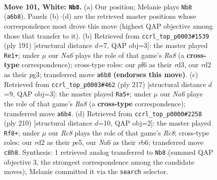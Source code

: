 \documentclass[11pt]{article}
\begin{document}
\clearpage

\begin{figure}[p]\centering
\begin{subfigure}{0.46\textwidth}\centering
\resizebox{\linewidth}{!}{%
\newchessgame
\chessboard[
  setfen={2R5/6p1/N4p1k/7p/7P/6PK/3r4/8 w - - 26 101},
  showmover=false,
  pgfstyle=straightmove, color=movearrow, markmove={a6-b8}
]}
\caption{}
\end{subfigure}\hfill
\begin{subfigure}{0.46\textwidth}\centering
\resizebox{\linewidth}{!}{%
\newchessgame
\chessboard[
  setfen={8/8/6pk/7p/4K2P/3R1PP1/8/r7 b - - 59 96},
  showmover=false,
  pgfstyle=straightmove, color=movearrow, markmove={a1-e1}
]}
\caption{}
\end{subfigure}
\\[4pt]
\begin{subfigure}{0.46\textwidth}\centering
\resizebox{\linewidth}{!}{%
\newchessgame
\chessboard[
  setfen={8/5pk1/7p/5K1P/5PP1/1R6/8/r7 b - - 24 109},
  showmover=false,
  pgfstyle=straightmove, color=movearrow, markmove={a1-a5}
]}
\caption{}
\end{subfigure}\hfill
\begin{subfigure}{0.46\textwidth}\centering
\resizebox{\linewidth}{!}{%
\newchessgame
\chessboard[
  setfen={2R5/8/1r3k2/4p1p1/5pP1/5P2/4PK2/8 w - - 14 106},
  showmover=false,
  pgfstyle=straightmove, color=movearrow, markmove={c8-f8}
]}
\caption{}
\end{subfigure}
\caption{\textbf{Move 101, White: \texttt{Nb8}.} (a) Our position; Melanie plays \texttt{Nb8} (\texttt{a6b8}). Panels (b)--(d) are the retrieved master positions whose correspondence most drove this move (highest QAP objective among those that transfer to it). (b) Retrieved from \texttt{ccrl\_top\_p0003\#1539} (ply 191) [structural distance $d$=7, QAP obj=3]: the master played \texttt{Re1+}; under $\mu$ our \emph{Na6} plays the role of that game's \emph{Ra8} (a \textbf{cross-type} correspondence); cross-type roles: our \emph{p}f6 as their \emph{r}d3, our \emph{r}d2 as their \emph{p}g3; transferred move \texttt{a6b8} \textbf{(endorses this move)}. (c) Retrieved from \texttt{ccrl\_top\_p0003\#462} (ply 217) [structural distance $d$=9, QAP obj=3]: the master played \texttt{Ra5+}; under $\mu$ our \emph{Na6} plays the role of that game's \emph{Ra8} (a \textbf{cross-type} correspondence); transferred move \texttt{a6b4}. (d) Retrieved from \texttt{ccrl\_top\_p0000\#2258} (ply 210) [structural distance $d$=10, QAP obj=2]: the master played \texttt{Rf8+}; under $\mu$ our \emph{Rc8} plays the role of that game's \emph{Rc8}; cross-type roles: our \emph{r}d2 as their \emph{p}e5, our \emph{N}a6 as their \emph{r}b6; transferred move \texttt{c8h8}. Synthesis: 1 retrieved analog transferred to \texttt{Nb8} (summed QAP objective 3, the strongest correspondence among the candidate moves); Melanie committed it via the \texttt{search} selector.}
\label{fig:thought-m200}
\end{figure}
\end{document}
